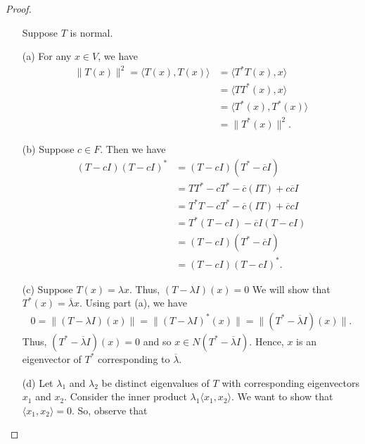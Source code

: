 \begin{proof}
\begin{enumerate}
    Suppose \( T  \) is normal.
    \item[(a)] For any \( x \in V  \), we have
        \begin{align*}
            \|T(x)\|^{2} = \langle T(x) , T(x) \rangle &= \langle T^{*}T(x) , x  \rangle \\ 
                                                       &= \langle TT^{*}(x) , x   \rangle \\
                                                                                        &= \langle T^{*}(x) ,  T^{*}(x) \rangle \\
                                                                                        &= \|T^{*}(x)\|^{2}.
        \end{align*}
    \item[(b)] Suppose \( c \in F  \). Then we have
        \begin{align*}
            (T - cI)(T - cI)^{*} &= (T - cI)(T^{*} - \overline{c}I) \\
                                 &= TT^{*} - c T^{*} - \overline{c} (IT) + c \overline{c} I\\
                                 &= T^{*}T - c T^{*} - \overline{c} (IT) + \overline{c} c   I \\
                                 &= T^{*} (T - cI) - \overline{c} I  (T - cI) \\
                                 &= (T - cI) (T^{*} - \overline{c}I) \\
                                 &= (T - cI) (T  - cI)^{*}.
        \end{align*}
    \item[(c)] Suppose \( T(x) = \lambda x  \). Thus, \( (T - \lambda I)(x) = 0  \)  We will show that \( T^{*}(x) = \overline{\lambda} x  \). Using part (a), we have
        \begin{align*}
            0  = \|(T - \lambda I)(x)\| = \|(T - \lambda I)^{*}(x)\| =  \|(T^{*} - \overline{\lambda} I )(x)\|.  
        \end{align*}
        Thus, \( (T^{*} - \overline{\lambda} I )(x) = 0   \) and so \( x \in N(T^{*} - \overline{\lambda} I )  \). Hence, \( x  \) is an eigenvector of \( T^{*}  \) corresponding to \( \overline{\lambda} \). 
    \item[(d)] Let \( {\lambda}_{1} \) and \( {\lambda}_{2} \) be distinct eigenvalues of \( T  \) with corresponding eigenvectors \( {x}_{1} \) and \( {x}_{2} \). Consider the inner product \( {\lambda}_{1} \langle {x}_{1} , {x}_{2} \rangle \). We want to show that \( \langle {x}_{1} , {x}_{2} \rangle = 0  \). So, observe that

\end{enumerate}
\end{proof}
